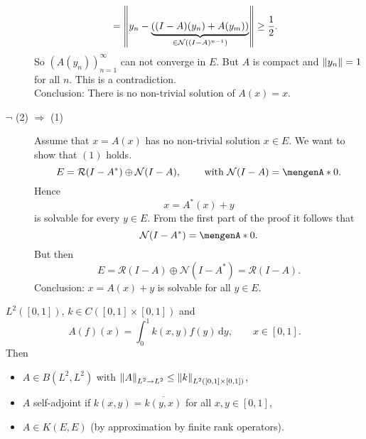 \begin{beweis}
\begin{description}
\begin{align*}
			&=  \norm{y_n - \underset{\in \mathcal{N}((I-A)^{n-1})}{\underbrace{((I-A)(y_n) + A(y_m))}}} \geq \frac{1}{2}.
		\end{align*}
		So $(A(y_n))_{n=1}^{\infty}$ can not converge in $E$. But $A$ is compact and $\norm{y_n}=1$ for all $n$. This is a contradiction. \\
		Conclusion: There is no non-trivial solution of $A(x)=x$.
		\item[$\lnot$ (2) $\Rightarrow$ (1)] Assume that $x = A(x)$ has no non-trivial solution $x \in E$. We want to show that $(1)$ holds.
		\[
			E = \mathcal{R}(I-A^*) \oplus \mathcal{N}(I-A), \qquad \text{ with }\mathcal{N}(I-A) = \set{0}.
		\]
		Hence 
		\[
			x = A^*(x)+y
		\] is solvable for every $y \in E$. From the first part of the proof it follows that 
		\[
			\mathcal{N}(I-A^*) = \set{0}.
		\]
		But then
		\[
			E = \mathcal{R}(I-A) \oplus \mathcal{N}(I-A^*) = \mathcal{R}(I-A).
		\]
		Conclusion: $x = A(x) + y$ is solvable for all $y \in E$.
	\end{description}
\end{beweis}

\begin{beispiel}
	$L^2([0,1])$, $k \in C([0,1] \times [0,1])$ and
	\[
		A(f)(x) = \int_{0}^{1}k(x,y)f(y) \,\mathrm{d}y , \qquad x \in [0,1].
	\]
	Then
	\begin{itemize}
		\item $A \in B(L^2,L^2)$ with $\norm{A}_{L^2 \to L^2} \leq \norm{k}_{L^2([0,1] \times [0,1])}$,
		\item $A$ self-adjoint if $k(x,y) = \overline{k(y,x)}$ for all $x,y \in [0,1]$,
		\item $A \in K(E,E)$ (by approximation by finite rank operators). 
	\end{itemize}
\end{beispiel}

